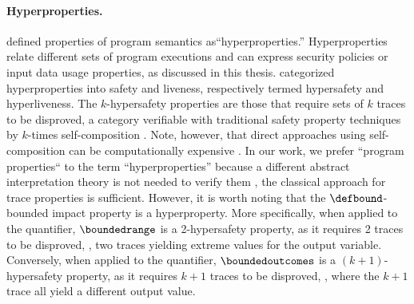 \paragraph{Hyperproperties.}

 defined properties of program semantics as``hyperproperties.''
Hyperproperties relate different sets of program executions and can express security policies or input data usage properties, as discussed in this thesis.
\textcite{Clarkson2010} categorized hyperproperties into safety and liveness, respectively termed hypersafety and hyperliveness.
The $k$-hypersafety properties are those that require sets of $k$ traces to be disproved, a category verifiable with traditional safety property techniques by $k$-times self-composition .
Note, however, that direct approaches using self-composition can be computationally expensive .
In our work, we prefer ``program properties`` to the term ``hyperproperties'' because a different abstract interpretation theory is not needed to verify them ,
the classical approach for trace properties  is sufficient.
However, it is worth noting that the $\defbound$-bounded impact property is a hyperproperty.
More specifically, when applied to the \rangename{} quantifier, $\boundedrange$ is a 2-hypersafety property, as it requires 2 traces to be disproved, \ie, two traces yielding extreme values for the output variable.
Conversely, when applied to the \outcomesname{} quantifier, $\boundedoutcomes$ is a $(k+1)$-hypersafety property, as it requires $k+1$ traces to be disproved, \ie, where the $k+1$ trace all yield a different output value.


